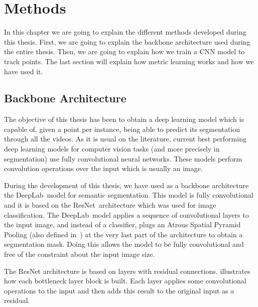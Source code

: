 
\chapter{Methods}
\label{cha:methods}

In this chapter we are going to explain the different methods developed during this thesis.
First, we are going to explain the backbone architecture used during the entire thesis.
Then, we are going to explain how we train a CNN model to track points.
The last section will explain how metric learning works and how we have used it.

\section{Backbone Architecture}
\label{sec:methods_backbone_architecture}

The objective of this thesis has been to obtain a deep learning model which is capable of, given a point per instance, being able to predict its segmentation through all the videos.
As it is usual on the literature, current best performing deep learning models for computer vision tasks (and more precisely in segmentation) use fully convolutional neural networks.
These models perform convolution operations over the input which is usually an image.

During the development of this thesis, we have used as a backbone architecture the DeepLab~\deeplab model for semantic segmentation.
This model is fully convolutional and it is based on the ResNet~\resnet architecture which was used for image classification.
The DeepLab~\deeplab model applies a sequence of convolutional layers to the input image, and instead of a classifier, plugs an Atrous Spatial Pyramid Pooling (also defined in~\deeplab) at the very last part of the architecture to obtain a segmentation mask.
Doing this allows the model to be fully convolutional and free of the constraint about the input image size.

The ResNet architecture is based on layers with residual connections.
 illustrates how each bottleneck layer block is built.
Each layer applies some convolutional operations to the input and then adds this result to the original input as a residual.

